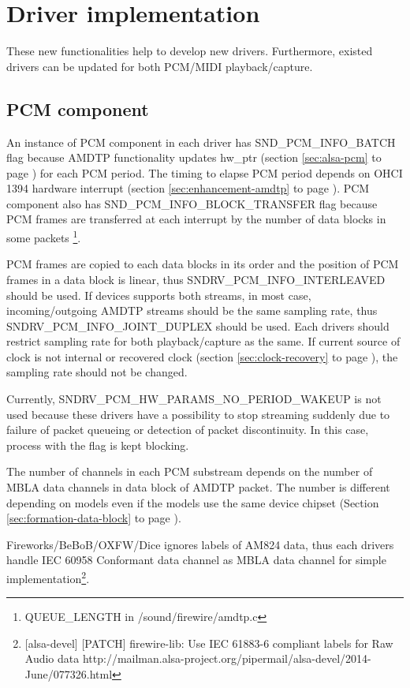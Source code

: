 \documentclass[onecolumn]{article}
\begin{document}
\section{Driver implementation}

These new functionalities help to develop new drivers. Furthermore, existed drivers can be updated for both PCM/MIDI playback/capture.

\subsection{PCM component}

An instance of PCM component in each driver has SND\_PCM\_INFO\_BATCH flag because AMDTP functionality updates hw\_ptr (section \ref{sec:alsa-pcm} to page \pageref{sec:alsa-pcm}) for each PCM period. The timing to elapse PCM period depends on OHCI 1394 hardware interrupt (section \ref{sec:enhancement-amdtp} to page \pageref{sec:enhancement-amdtp}). PCM component also has SND\_PCM\_INFO\_BLOCK\_TRANSFER flag because PCM frames are transferred at each interrupt by the number of data blocks in some packets \footnote{QUEUE\_LENGTH in /sound/firewire/amdtp.c}.

PCM frames are copied to each data blocks in its order and the position of PCM frames in a data block is linear, thus SNDRV\_PCM\_INFO\_INTERLEAVED should be used. If devices supports both streams, in most case, incoming/outgoing AMDTP streams should be the same sampling rate, thus SNDRV\_PCM\_INFO\_JOINT\_DUPLEX should be used. Each drivers should restrict sampling rate for both playback/capture as the same. If current source of clock is not internal or recovered clock (section \ref{sec:clock-recovery} to page \pageref{sec:clock-recovery}), the sampling rate should not be changed.

Currently, SNDRV\_PCM\_HW\_PARAMS\_NO\_PERIOD\_WAKEUP is not used because these drivers have a possibility to stop streaming suddenly due to failure of packet queueing or detection of packet discontinuity. In this case, process with the flag is kept blocking.

The number of channels in each PCM substream depends on the number of MBLA data channels in data block of AMDTP packet. The number is different depending on models even if the models use the same device chipset (Section \ref{sec:formation-data-block} to page \pageref{sec:formation-data-block}).

Fireworks/BeBoB/OXFW/Dice ignores labels of AM824 data, thus each drivers handle IEC 60958 Conformant data channel as MBLA data channel for simple implementation\footnote{[alsa-devel] [PATCH] firewire-lib: Use IEC 61883-6 compliant labels for Raw Audio data http://mailman.alsa-project.org/pipermail/alsa-devel/2014-June/077326.html}.
\end{document}
